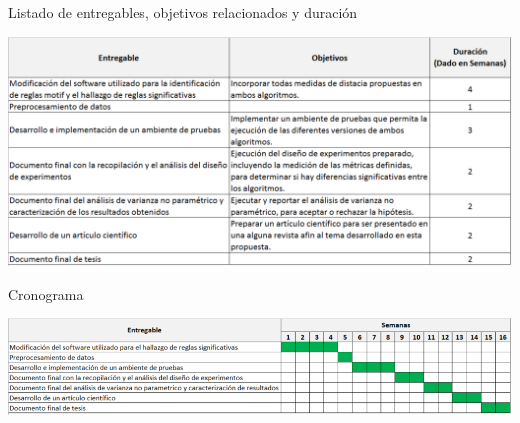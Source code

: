 \begin{table}[h]
\caption{Listado de entregables, objetivos relacionados y duraci\'on}
\label{arm:tabla 3}
\begin{center}
\includegraphics[scale=0.7]{deliverables.png}\\
\end{center}
\end{table}


\begin{table}[h]
\caption{Cronograma}
\label{arm:tabla 4}
\begin{center}
\includegraphics[scale=0.62]{projectPlan.png}\\
\end{center}
\end{table}